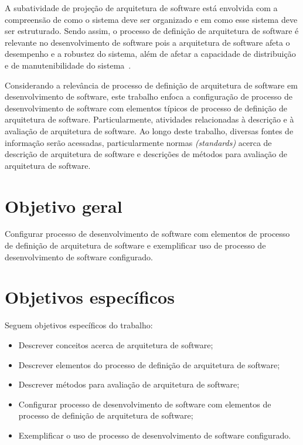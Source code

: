 A subatividade de projeção de arquitetura de software está envolvida com a compreensão de como o sistema deve ser organizado e em como esse sistema deve ser estruturado. Sendo assim, o processo de definição de arquitetura de software é relevante no desenvolvimento de software pois a arquitetura de software afeta o desempenho e a robustez do sistema, além de afetar a capacidade de distribuição e de manutenibilidade do sistema~\cite{Sommerville_2011_texbook}.


Considerando a relevância de processo de definição de arquitetura de software em desenvolvimento de software, este trabalho enfoca a configuração de processo de desenvolvimento de software com elementos típicos de processo de definição de arquitetura de software. Particularmente, atividades relacionadas à descrição e à avaliação de arquitetura de software. Ao longo deste trabalho, diversas fontes de informação serão acessadas, particularmente normas \emph{(standards)} acerca de descrição de arquitetura de software e descrições de métodos para avaliação de arquitetura de software.


\section{Objetivo geral}

Configurar processo de desenvolvimento de software com elementos de processo de definição de arquitetura de software e exemplificar uso de processo de desenvolvimento de software configurado.

\section{Objetivos específicos}

Seguem objetivos específicos do trabalho:

\begin{itemize}
    \item Descrever  conceitos acerca de arquitetura de software;
    \item Descrever elementos do processo de definição de arquitetura de software;
    \item Descrever métodos para avaliação de arquitetura de software;
    \item Configurar processo de desenvolvimento de software com elementos de processo de definição de arquitetura de software;
    \item Exemplificar o uso de processo de desenvolvimento de software configurado.
\end{itemize}

